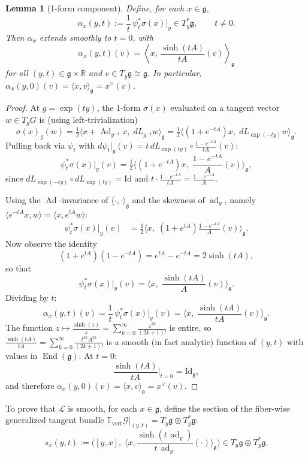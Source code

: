 \documentclass[reqno]{amsart}
\theoremstyle{plain}
\newtheorem{Lem}[Thm]{Lemma}
\theoremstyle{definition}
\newcommand{\R}{\mathbb{R}}
\newcommand{\g}{\mathfrak{g}}
\newcommand{\Ad}{\operatorname{Ad}}
\renewcommand{\L}{\mathcal{L}}
\newcommand{\ad}{\operatorname{ad}}
\begin{document}
\begin{Lem}[1-form component]\label{lem:cov}
Define, for each $x \in \g$,
\[
\alpha_x(y,t) := \frac{1}{t}\,\psi_t^*\sigma(x)\big|_y \in T_y^*\g, \qquad t \neq 0.
\]
Then $\alpha_x$ extends smoothly to $t = 0$, with
\[
\alpha_x(y,t)(v) = \left\langle x,\, \frac{\sinh(tA)}{tA}(v)\right\rangle_\g
\]
for all $(y,t) \in \g \times \R$ and $v \in T_y\g \cong \g$. In particular, $\alpha_x(y,0)(v) = \langle x, v\rangle_\g = x^\vee(v)$.
\end{Lem}
 
\begin{proof}
At $g = \exp(ty)$, the 1-form $\sigma(x)$ evaluated on a tangent vector $w \in T_gG$ is (using left-trivialization)
\[
\sigma(x)_g(w) = \tfrac{1}{2}\big\langle x + \Ad_{g^{-1}} x,\; dL_{g^{-1}} w \big\rangle_\g = \tfrac{1}{2}\big\langle (1 + e^{-tA})x,\; dL_{\exp(-ty)} w \big\rangle_\g.
\]
Pulling back via $\psi_t$ with $d\psi_t|_y(v) = t\, dL_{\exp(ty)} \circ \frac{1-e^{-tA}}{tA}(v)$:
\[
\psi_t^*\sigma(x)\big|_y(v) = \tfrac{1}{2}\Big\langle (1 + e^{-tA})x,\;\frac{1-e^{-tA}}{A}(v)\Big\rangle_\g,
\]
since $dL_{\exp(-ty)} \circ dL_{\exp(ty)} = \mathrm{Id}$ and $t \cdot \frac{1-e^{-tA}}{tA} = \frac{1-e^{-tA}}{A}$.
 
Using the $\Ad$-invariance of $\langle\cdot,\cdot\rangle_\g$ and the skewness of $\ad_y$, namely $\langle e^{-tA}x, w\rangle = \langle x, e^{tA}w\rangle$:
\begin{align*}
\psi_t^*\sigma(x)\big|_y(v)
&= \tfrac{1}{2}\Big\langle x,\; (1 + e^{tA})\frac{1-e^{-tA}}{A}(v)\Big\rangle_\g.
\end{align*}
Now observe the identity
\[
(1 + e^{tA})(1 - e^{-tA}) = e^{tA} - e^{-tA} = 2\sinh(tA),
\]
so that
\[
\psi_t^*\sigma(x)\big|_y(v) = \Big\langle x,\;\frac{\sinh(tA)}{A}(v)\Big\rangle_\g.
\]
Dividing by $t$:
\[
\alpha_x(y,t)(v) = \frac{1}{t}\,\psi_t^*\sigma(x)\big|_y(v) = \Big\langle x,\;\frac{\sinh(tA)}{tA}(v)\Big\rangle_\g.
\]
The function $z \mapsto \frac{\sinh(z)}{z} = \sum_{k=0}^\infty \frac{z^{2k}}{(2k+1)!}$ is entire, so $\frac{\sinh(tA)}{tA} = \sum_{k=0}^\infty \frac{t^{2k} A^{2k}}{(2k+1)!}$ is a smooth (in fact analytic) function of $(y,t)$ with values in $\operatorname{End}(\g)$. At $t=0$:
\[
\frac{\sinh(tA)}{tA}\Big|_{t=0} = \mathrm{Id}_\g,
\]
and therefore $\alpha_x(y,0)(v) = \langle x, v\rangle_\g = x^\vee(v)$.
\end{proof}
 
To prove that $\L$ is smooth, for each $x\in \g$, define the section of the fiber-wise generalized tangent bundle $\mathbb{T}_{\mathrm{vert}}\mathcal{G}|_{(y,t)}= T_y\g \oplus T_y^*\g$:
\begin{equation}\label{eq:spanning}
s_x(y,t) := \Big([y,x],\;\Big\langle x, \frac{\sinh(t\,\ad_y)}{t\,\ad_y}(\cdot)\Big\rangle_\g\Big) \in T_y\g \oplus T_y^*\g.
\end{equation}
\end{document}
